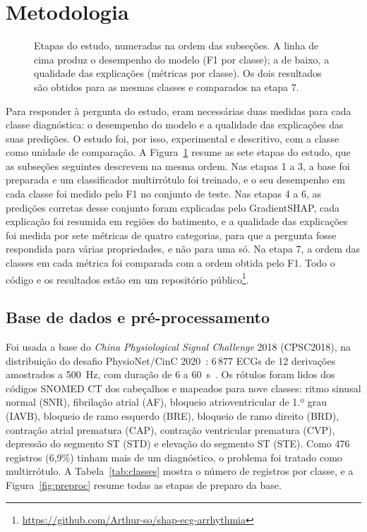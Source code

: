 \section{Metodologia}\label{sec:metodologia}

\begin{figure}[!t]\centering

\caption{Etapas do estudo, numeradas na ordem das subseções. A linha de cima produz o desempenho do modelo (F1 por classe); a de baixo, a qualidade das explicações (métricas por classe). Os dois resultados são obtidos para as mesmas classes e comparados na etapa 7.}\label{fig:pipeline}
\end{figure}

Para responder à pergunta do estudo, eram necessárias duas medidas para cada classe diagnóstica: o desempenho do modelo e a qualidade das explicações das suas predições. O estudo foi, por isso, experimental e descritivo, com a classe como unidade de comparação. A Figura~\ref{fig:pipeline} resume as sete etapas do estudo, que as subseções seguintes descrevem na mesma ordem. Nas etapas 1 a 3, a base foi preparada e um classificador multirrótulo foi treinado, e o seu desempenho em cada classe foi medido pelo F1 no conjunto de teste. Nas etapas 4 a 6, as predições corretas desse conjunto foram explicadas pelo GradientSHAP, cada explicação foi resumida em regiões do batimento, e a qualidade das explicações foi medida por sete métricas de quatro categorias, para que a pergunta fosse respondida para várias propriedades, e não para uma só. Na etapa 7, a ordem das classes em cada métrica foi comparada com a ordem obtida pelo F1. Todo o código e os resultados estão em um repositório público\footnote{\url{https://github.com/Arthur-so/shap-ecg-arrhythmia}}.

\subsection{Base de dados e pré-processamento}\label{sec:dados}
Foi usada a base do \textit{China Physiological Signal Challenge} 2018 (CPSC2018), na distribuição do desafio PhysioNet/CinC 2020~\cite{perezalday2020}: 6\,877 ECGs de 12 derivações amostrados a 500~Hz, com duração de 6 a 60~s~\cite{zhang2021}. Os rótulos foram lidos dos códigos SNOMED CT dos cabeçalhos e mapeados para nove classes: ritmo sinusal normal (SNR), fibrilação atrial (AF), bloqueio atrioventricular de 1.º grau (IAVB), bloqueio de ramo esquerdo (BRE), bloqueio de ramo direito (BRD), contração atrial prematura (CAP), contração ventricular prematura (CVP), depressão do segmento ST (STD) e elevação do segmento ST (STE). Como 476 registros (6,9\%) tinham mais de um diagnóstico, o problema foi tratado como multirrótulo. A Tabela~\ref{tab:classes} mostra o número de registros por classe, e a Figura~\ref{fig:preproc} resume todas as etapas de preparo da base.

